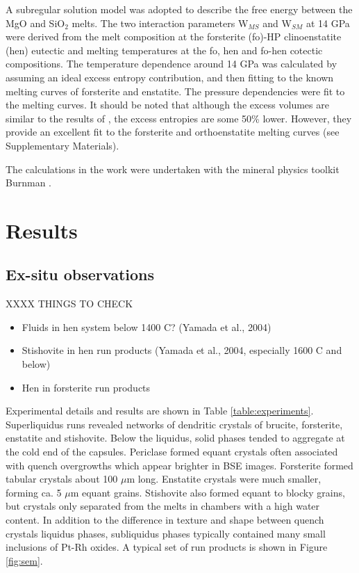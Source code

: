 \documentclass[review]{elsarticle}
\begin{document}
A subregular solution model was adopted to describe the free energy between the MgO and SiO$_2$ melts. The two interaction parameters W$_{MS}$ and W$_{SM}$ at 14 GPa were derived from the melt composition at the forsterite (fo)-HP clinoenstatite (hen) eutectic \citep{PWMW1998} and melting temperatures at the fo, hen and fo-hen cotectic compositions. The temperature dependence around 14 GPa was calculated by assuming an ideal excess entropy contribution, and then fitting to the known melting curves of forsterite and enstatite. The pressure dependencies were fit to the melting curves. It should be noted that although the excess volumes are similar to the results of \cite{DKS2013}, the excess entropies are some 50\% lower. However, they provide an excellent fit to the forsterite and orthoenstatite melting curves (see Supplementary Materials).

The calculations in the work were undertaken with the mineral physics toolkit Burnman \citep[available from \url{https://geodynamics.org/cig/software/burnman/}][]{CHRU2014}.

\clearpage
\section{Results}
\subsection{Ex-situ observations}

XXXX THINGS TO CHECK
\begin{itemize}
\item Fluids in hen system below 1400 C? (Yamada et al., 2004)
\item Stishovite in hen run products (Yamada et al., 2004, especially 1600 C and below)
\item Hen in forsterite run products
\end{itemize}

Experimental details and results are shown in Table \ref{table:experiments}. Superliquidus runs revealed networks of dendritic crystals of brucite, forsterite, enstatite and stishovite. Below the liquidus, solid phases tended to aggregate at the cold end of the capsules. Periclase formed equant crystals often associated with quench overgrowths which appear brighter in BSE images. Forsterite formed tabular crystals about 100 $\mu$m long. Enstatite crystals were much smaller, forming ca. 5 $\mu$m equant grains. Stishovite also formed equant to blocky grains, but crystals only separated from the melts in chambers with a high water content. In addition to the difference in texture and shape between quench crystals liquidus phases, subliquidus phases typically contained many small inclusions of Pt-Rh oxides. A typical set of run products is shown in Figure \ref{fig:sem}.
\end{document}
